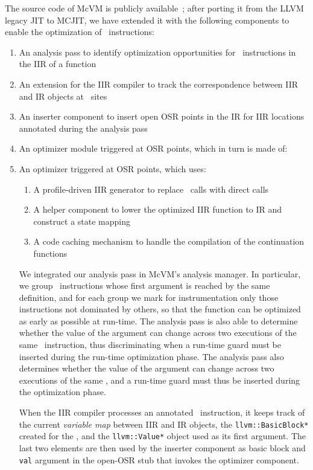 The source code of McVM is publicly available~\cite{mcvm}; after porting it from the LLVM legacy JIT to MCJIT, we have extended it with the following components to enable the optimization of \feval\ instructions:
\begin{enumerate}
\item An analysis pass to identify optimization opportunities for \feval\ instructions in the IIR of a function
\item An extension for the IIR compiler to track the correspondence between IIR and IR objects at \feval\ sites
\item An inserter component to insert open OSR points in the IR for IIR locations annotated during the analysis pass
\ifdefined \fullver
\item An optimizer module triggered at OSR points, which in turn is made of:
\else
\item An optimizer triggered at OSR points, which uses:
\fi
\ifdefined \noauthorea
\begin{enumerate}[noitemsep]
\else
\begin{enumerate}
\fi
\item A profile-driven IIR generator to replace \feval\ calls with direct calls
\item A helper component to lower the optimized IIR function to IR and construct a state mapping 
\item A code caching mechanism to handle the compilation of the continuation functions
\end{enumerate}
\end{enumerate}

We integrated our analysis pass in McVM's analysis manager. In particular, we group \feval\ instructions whose first argument is reached by the same definition, and for each group we mark for instrumentation only those instructions not dominated by others, so that the function can be optimized as early as possible at run-time. 
\ifdefined \fullver
The analysis pass is also able to determine whether the value of the argument can change across two executions of the same \feval\ instruction, thus discriminating when a run-time guard must be inserted during the run-time optimization phase.
\else
The analysis pass also determines whether the value of the argument can change across two executions of the same \feval, and a run-time guard must thus be inserted during the optimization phase.
\fi

When the IIR compiler processes an annotated \feval\ instruction, it keeps track of the current {\em variable map} between IIR and IR objects, the {\tt llvm::BasicBlock*} created for the \feval, and the {\tt llvm::Value*} object used as its first argument. The last two elements are then used by the inserter component as basic block and {\tt val} argument in the open-OSR stub that invokes the optimizer component.


\end{enumerate}
